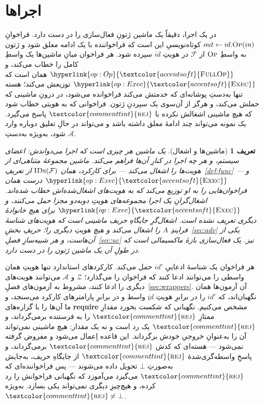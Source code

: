 \documentclass[10pt,oneside,openany]{book}
\newcommand{\F}{\mathcal{F}}
\newcommand{\Zenv}{\mathcal{Z}}
\newcommand{\Adv}{\mathcal{A}}
\newcommand{\op}[1]{\textnormal{\textsc{#1}}}
\newcommand{\opl}[1]{\hyperlink{op:#1}{\textcolor{accentsoft}{\op{#1}}}}
\newcommand{\fopl}[1]{\hyperlink{op:#1}{\textcolor{accentsoft}{\op{Full}\op{#1}}}}
\newcommand{\IDs}{\op{IDs}}
\newcommand{\id}{id}
\newcommand{\atom}[1]{\textcolor{commenttint}{\op{#1}}}
\newcommand{\rej}{\atom{rej}}
\newcommand{\none}{\bot}
\newcommand{\Op}{\op{Op}}
\theoremstyle{accentdef}
\newtheorem{definition}{تعریف}[chapter]
\theoremstyle{accentplain}
\begin{document}
\section{اجراها}\label{sec:execution}

در یک اجرا، دقیقاً یک ماشین ژتونِ فعال‌سازی را در دست دارد. فراخوانِ $out
\gets \id.\Op(in)$ کوتاه‌نویسیِ این است که فراخواننده با یک ادامه معلق
شود و ژتون به واسطِ $\Op$ از $\F$ در هویتِ $\id$ سپرده شود. هر فراخوان
میانِ ماشین‌ها یک واسطِ کامل را خطاب می‌کند، و $\fopl{Op}$ همان است که
$\opl{Exec}$ توزیعش می‌کند؛ هسته تنها به‌دستِ پوشانه‌ای که خدمتش می‌کند
فراخوانده می‌شود، در درونِ ماشینی که حملش می‌کند، و هرگز از آن‌سوی یک
سپردنِ ژتون. فراخوانی که به هویتی خطاب شود که هیچ ماشینی اشغالش نکرده با
$\rej$ پاسخ می‌گیرد. یک نمونه می‌تواند چند ادامهٔ معلق داشته باشد و
می‌تواند در حالِ تعلیق دوباره وارد شود، به‌ویژه به‌دستِ $\Adv$.

\begin{definition}[ماشین‌ها و اشغال]\label{def:occ}
یک \emph{ماشین} هر چیزی است که اجرا می‌دواندش: اعضای سیستم، و هر چه اجرا
در کنارِ آن‌ها فراهم می‌کند. ماشین مجموعهٔ متناهی‌ای از هویت‌ها را
\emph{اشغال می‌کند} --- برای کارکرد، همان $\IDs(\F)$ از
تعریفِ~\ref{def:func} --- و $\opl{Exec}$ درست همان فراخوان‌هایی را به او
توزیع می‌کند که به هویت‌های اشغال‌شده‌اش خطاب شده‌اند. اشغال‌گرانِ یک اجرا
مجموعه‌های هویتِ دوبه‌دو مجزا حمل می‌کنند، و $\opl{Exec}$ برای هیچ
خانوادهٔ دیگری تعریف نشده است. \emph{اشغال‌گرِ جایگاهِ حریف} ماشینی است که
هویت‌های شناسهٔ فرایندِ $A$ را اشغال می‌کند و هیچ هویتِ دیگری را؛ حریفِ
بخشِ~\ref{sec:adv} یکی از آن‌هاست، و هر شبیه‌سازِ فصلِ~\ref{sec:uc} نیز.
یک \emph{فعال‌سازی} بازهٔ ماکسیمالی است که در طولِ آن یک ماشین ژتون را در
دست دارد.
\end{definition}

هر فراخوان یک شناسهٔ ادعاییِ $\id'$ حمل می‌کند. کارکردهای استاندارد تنها
هویتِ همان واسطی را می‌توانند ادعا کنند که فراخوان را می‌گذارد؛ $\Zenv$ و
$\Adv$ می‌توانند هویت‌های دیگری را ادعا کنند، مشروط به آزمون‌های
فصلِ~\ref{sec:wrappers}. آن آزمون‌ها همان نگهبان‌اند، که $\id'$ را در
برابرِ هویتِ $\id$ِ واسط و در برابرِ پارامترهای کارکرد می‌سنجد، و ما
آن‌ها را با گزاره‌های \textbf{require} مشخص می‌کنیم. نگهبانی که شکست
بخورد مقدارِ ممتازِ $\rej$ را به فرستنده برمی‌گرداند، و $\rej$ یک رد است
و نه یک مقدار: هیچ ماشینی نمی‌تواند آن را به‌عنوانِ خروجیِ خودش
برگرداند. این قاعده اِعمال می‌شود و مفروض گرفته نمی‌شود --- هسته‌ای که
کدش $\rej$ برمی‌گرداند، و پاسخِ واسطه‌گری‌شدهٔ $\rej$ از جایگاهِ حریف،
به‌جایش به‌صورتِ $\none$ تحویل داده می‌شوند --- پس فراخواننده‌ای که $\rej$
می‌گیرد می‌آموزد که نگهبانی فراخوانش را رد کرده، و هیچ‌چیزِ دیگری
نمی‌تواند یکی بسازد. به‌ویژه $\rej \neq \none$.
\end{document}
